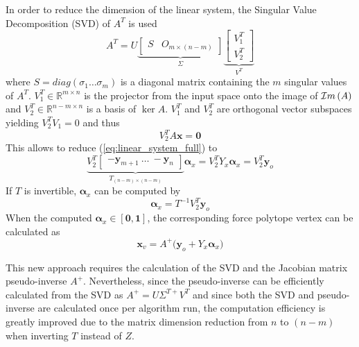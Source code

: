 In order to reduce the dimension of the linear system, the Singular Value Decomposition (SVD) \cite{klema_singular_1980} of $A^T$ is used
\begin{equation}
     A^T =  U  \underbrace{\begin{bmatrix}S & O_{m\times (n-m)}\end{bmatrix}}_{\Sigma}\underbrace{\begin{bmatrix}V_1^T \\ V_2^T \end{bmatrix}}_{V^T}
\end{equation}
where $S= diag( \sigma_1 \dots \sigma_m)$ is a diagonal matrix containing the $m$ singular values of $A^T$. $V_1^T \in \mathbb{R}^{m \times n}$ is the projector from the input space onto the image of $\mathcal{I}m\left(A\right)$ and $V_2^T \in \mathbb{R}^{n-m \times n}$ is a basis of $\ker{A}$. $V_1^T$ and $V_2^T$ are orthogonal vector subspaces yielding $V_2^T V_1 = 0$ and thus 
\begin{equation}
    V_2^T A\bm{x} = \bm{0}
\end{equation}
This allows to reduce (\ref{eq:linear_system_full}) to
\begin{equation}
    \underbrace{V_2^T\begin{bmatrix}-\bm{y}_{m+1} ~\dots~ -\bm{y}_{n} \end{bmatrix}}_{T_{(n-m)\times (n-m)}} \bm{\alpha}_x  = V_2^TY_x\bm{\alpha}_x = V_2^T\bm{y}_o
    \label{eq:linear_system_svd}
\end{equation}
If $T$ is invertible, $\bm{\alpha}_x$ can be computed by
\begin{equation}
\bm{\alpha}_x = T^{-1}V_2^T\bm{y}_o
\end{equation}
When the computed $\bm{\alpha}_x \in [\bm{0},\bm{1}]$,  the corresponding force polytope vertex can be calculated as
\begin{equation}
    \bm{x}_{v} = A^{+} \big( \bm{y}_o + Y_x\bm{\alpha}_x\big)
\end{equation}

This new approach requires the calculation of the SVD and the Jacobian matrix pseudo-inverse $A^{+}$. Nevertheless, since the pseudo-inverse can be efficiently calculated from the SVD as $A^{+} = U\Sigma^{T+}V^T$ and since both the SVD and pseudo-inverse are calculated once per algorithm run, the computation efficiency is greatly improved due to the matrix dimension reduction from $n$ to $(n-m)$ when inverting $T$ instead of $Z$.

